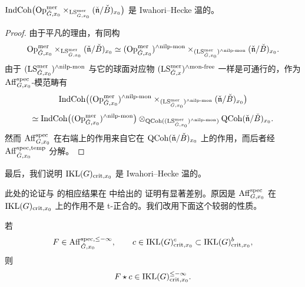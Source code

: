 \begin{proposition}\label{prop:3.4.4.4}
$\mathrm{IndCoh}\bigl(\mathrm{Op}^{\mathrm{mer}}_{\check G,x_0}
\times_{\mathrm{LS}^{\mathrm{mer}}_{\check G,x_0}}(\check{\mathfrak{n}}/\check B)_{x_0}\bigr)$
是 Iwahori–Hecke 温的。
\end{proposition}

\begin{proof}
由于平凡的理由，有同构
\[
\mathrm{Op}^{\mathrm{mer}}_{\check G,x_0}
\times_{\mathrm{LS}^{\mathrm{mer}}_{\check G,x_0}}(\check{\mathfrak{n}}/\check B)_{x_0}
\simeq
(\mathrm{Op}^{\mathrm{mer}}_{\check G,x_0})^{\wedge\mathrm{nilp\text{-}mon}}
\times_{(\mathrm{LS}^{\mathrm{mer}}_{\check G,x_0})^{\wedge\mathrm{nilp\text{-}mon}}}
(\check{\mathfrak{n}}/\check B)_{x_0}.
\]
由于 $(\mathrm{LS}^{\mathrm{mer}}_{\check G,x_0})^{\wedge\mathrm{nilp\text{-}mon}}$ 与它的球面对应物
$(\mathrm{LS}^{\mathrm{mer}}_{\check G,x})^{\wedge\mathrm{mon\text{-}free}}$ 一样是可通行的，作为
$\mathrm{Aff}^{\mathrm{spec}}_{G,x_0}$-模范畴有
\begin{equation}
\mathrm{IndCoh}\bigl((\mathrm{Op}^{\mathrm{mer}}_{\check G,x_0})^{\wedge\mathrm{nilp\text{-}mon}}
\times_{(\mathrm{LS}^{\mathrm{mer}}_{\check G,x_0})^{\wedge\mathrm{nilp\text{-}mon}}}
(\check{\mathfrak{n}}/\check B)_{x_0}\bigr)
\label{eq:3.4.11}
\end{equation}
\begin{equation}
\simeq
\mathrm{IndCoh}\bigl((\mathrm{Op}^{\mathrm{mer}}_{\check G,x_0})^{\wedge\mathrm{nilp\text{-}mon}}\bigr)
\otimes_{\mathrm{QCoh}((\mathrm{LS}^{\mathrm{mer}}_{\check G,x_0})^{\wedge\mathrm{nilp\text{-}mon}})}
\mathrm{QCoh}(\check{\mathfrak{n}}/\check B)_{x_0}.
\label{eq:3.4.12}
\end{equation}
然而 $\mathrm{Aff}^{\mathrm{spec}}_{G,x_0}$ 在右端上的作用来自它在
$\mathrm{QCoh}(\check{\mathfrak{n}}/\check B)_{x_0}$ 上的作用，而后者经
$\mathrm{Aff}^{\mathrm{spec},\mathrm{temp}}_{\check G,x_0}$ 分解。
\end{proof}

最后，我们说明 $\mathrm{IKL}(G)_{\mathrm{crit},x_0}$ 是 Iwahori–Hecke 温的。

\begin{remark}\label{rem:3.4.4.5}
此处的论证与 \cite[命题 7.2.6]{ABC+24a} 的相应结果在 \cite[第 7.4 节]{ABC+24a} 中给出的
证明有显著差别。原因是 $\mathrm{Aff}^{\mathrm{spec}}_{G,x_0}$ 在 $\mathrm{IKL}(G)_{\mathrm{crit},x_0}$ 上的作用不是
t-正合的。我们改用下面这个较弱的性质。
\end{remark}

\begin{lemma}\label{lem:3.4.4.6}
若
\[
F\in \mathrm{Aff}^{\mathrm{spec},\leq -\infty}_{\check G,x_0},
\qquad
c\in \mathrm{IKL}(G)^{c}_{\mathrm{crit},x_0}\subset \mathrm{IKL}(G)^{b}_{\mathrm{crit},x_0},
\]
则
\[
F\star c\in \mathrm{IKL}(G)^{\leq -\infty}_{\mathrm{crit},x_0}.
\]
\end{lemma}

